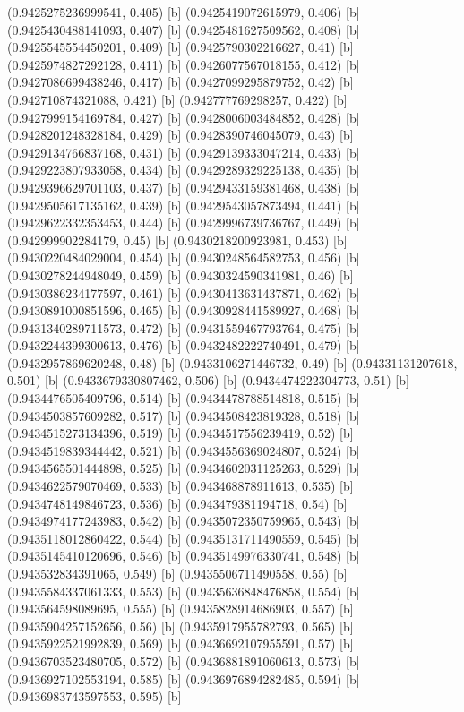 {{{(0.9425275236999541, 0.405) [b] 
(0.9425419072615979, 0.406) [b] 
(0.9425430488141093, 0.407) [b] 
(0.9425481627509562, 0.408) [b] 
(0.9425545554450201, 0.409) [b] 
(0.9425790302216627, 0.41) [b] 
(0.9425974827292128, 0.411) [b] 
(0.9426077567018155, 0.412) [b] 
(0.9427086699438246, 0.417) [b] 
(0.9427099295879752, 0.42) [b] 
(0.942710874321088, 0.421) [b] 
(0.942777769298257, 0.422) [b] 
(0.9427999154169784, 0.427) [b] 
(0.9428006003484852, 0.428) [b] 
(0.9428201248328184, 0.429) [b] 
(0.9428390746045079, 0.43) [b] 
(0.9429134766837168, 0.431) [b] 
(0.9429139333047214, 0.433) [b] 
(0.9429223807933058, 0.434) [b] 
(0.9429289329225138, 0.435) [b] 
(0.9429396629701103, 0.437) [b] 
(0.9429433159381468, 0.438) [b] 
(0.9429505617135162, 0.439) [b] 
(0.9429543057873494, 0.441) [b] 
(0.9429622332353453, 0.444) [b] 
(0.9429996739736767, 0.449) [b] 
(0.942999902284179, 0.45) [b] 
(0.9430218200923981, 0.453) [b] 
(0.9430220484029004, 0.454) [b] 
(0.9430248564582753, 0.456) [b] 
(0.9430278244948049, 0.459) [b] 
(0.9430324590341981, 0.46) [b] 
(0.9430386234177597, 0.461) [b] 
(0.9430413631437871, 0.462) [b] 
(0.9430891000851596, 0.465) [b] 
(0.9430928441589927, 0.468) [b] 
(0.9431340289711573, 0.472) [b] 
(0.9431559467793764, 0.475) [b] 
(0.9432244399300613, 0.476) [b] 
(0.9432482222740491, 0.479) [b] 
(0.9432957869620248, 0.48) [b] 
(0.9433106271446732, 0.49) [b] 
(0.94331131207618, 0.501) [b] 
(0.9433679330807462, 0.506) [b] 
(0.9434474222304773, 0.51) [b] 
(0.9434476505409796, 0.514) [b] 
(0.9434478788514818, 0.515) [b] 
(0.9434503857609282, 0.517) [b] 
(0.9434508423819328, 0.518) [b] 
(0.9434515273134396, 0.519) [b] 
(0.9434517556239419, 0.52) [b] 
(0.9434519839344442, 0.521) [b] 
(0.9434556369024807, 0.524) [b] 
(0.9434565501444898, 0.525) [b] 
(0.9434602031125263, 0.529) [b] 
(0.9434622579070469, 0.533) [b] 
(0.943468878911613, 0.535) [b] 
(0.9434748149846723, 0.536) [b] 
(0.943479381194718, 0.54) [b] 
(0.9434974177243983, 0.542) [b] 
(0.9435072350759965, 0.543) [b] 
(0.9435118012860422, 0.544) [b] 
(0.9435131711490559, 0.545) [b] 
(0.9435145410120696, 0.546) [b] 
(0.9435149976330741, 0.548) [b] 
(0.943532834391065, 0.549) [b] 
(0.9435506711490558, 0.55) [b] 
(0.9435584337061333, 0.553) [b] 
(0.9435636848476858, 0.554) [b] 
(0.943564598089695, 0.555) [b] 
(0.9435828914686903, 0.557) [b] 
(0.9435904257152656, 0.56) [b] 
(0.9435917955782793, 0.565) [b] 
(0.9435922521992839, 0.569) [b] 
(0.9436692107955591, 0.57) [b] 
(0.9436703523480705, 0.572) [b] 
(0.9436881891060613, 0.573) [b] 
(0.9436927102553194, 0.585) [b] 
(0.9436976894282485, 0.594) [b] 
(0.9436983743597553, 0.595) [b] 
}}}
